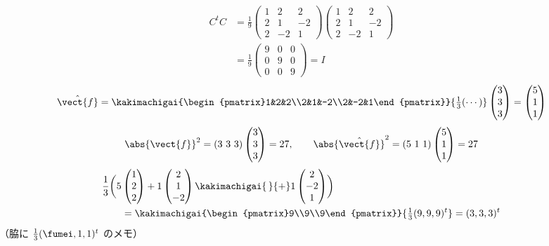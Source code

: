 \begin{align*}
  C^{t}C&=\frac{1}{9}\begin{pmatrix}1&2&2\\2&1&-2\\2&-2&1\end{pmatrix}\begin{pmatrix}1&2&2\\2&1&-2\\2&-2&1\end{pmatrix}\\
  &=\frac{1}{9}\begin{pmatrix}9&0&0\\0&9&0\\0&0&9\end{pmatrix}=I
\end{align*}
\[
  \hat{\vect{f}}=\kakimachigai{\begin{pmatrix}1&2&2\\2&1&-2\\2&-2&1\end{pmatrix}}{\tfrac{1}{3}(\cdots)}\begin{pmatrix}3\\3\\3\end{pmatrix}=\begin{pmatrix}5\\1\\1\end{pmatrix}
\]
\[
  \abs{\vect{f}}^{2}=(3\ 3\ 3)\begin{pmatrix}3\\3\\3\end{pmatrix}=27,\qquad
  \abs{\hat{\vect{f}}}^{2}=(5\ 1\ 1)\begin{pmatrix}5\\1\\1\end{pmatrix}=27
\]
\begin{align*}
  &\frac{1}{3}\biggl(5\begin{pmatrix}1\\2\\2\end{pmatrix}+1\begin{pmatrix}2\\1\\-2\end{pmatrix}\kakimachigai{\,}{+}1\begin{pmatrix}2\\-2\\1\end{pmatrix}\biggr)\\
  &\qquad=\kakimachigai{\begin{pmatrix}9\\9\\9\end{pmatrix}}{\tfrac{1}{3}(9,9,9)^{t}}=(3,3,3)^{t}
\end{align*}
（脇に $\frac{1}{3}(\fumei,1,1)^{t}$ のメモ）
